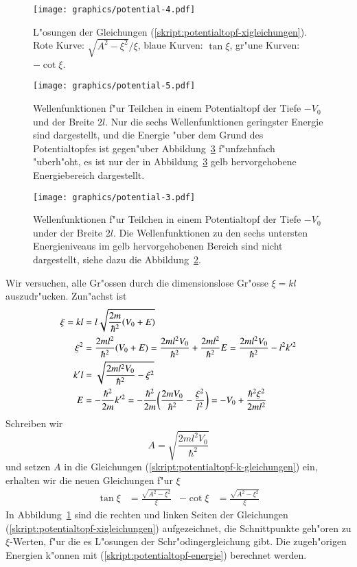\begin{figure}
\centering
\texttt{[image: graphics/potential-4.pdf]}
\caption{L"osungen der Gleichungen (\ref{skript:potentialtopf-xigleichungen}).
Rote Kurve: $\sqrt{A^2-\xi^2}/\xi$, blaue Kurven: $\tan\xi$, gr"une
Kurven: $-\cot\xi$.
\label{skript:loesungen-xigleichungen}}
\end{figure}%
\begin{figure}
\centering
\texttt{[image: graphics/potential-5.pdf]}
\caption{Wellenfunktionen f"ur Teilchen in einem Potentialtopf der
Tiefe $-V_0$ und der Breite $2l$.
Nur die sechs Wellenfunktionen geringster Energie sind dargestellt,
und die Energie "uber dem
Grund des Potentialtopfes ist gegen"uber
Abbildung~\ref{skript:potentialtopf-loesungen}
f"unfzehnfach "uberh"oht, es ist nur der in
Abbildung~\ref{skript:potentialtopf-loesungen}
gelb hervorgehobene Energiebereich dargestellt.
\label{skript:potentialtopf-loesungen-klein}}
\end{figure}
\begin{figure}
\centering
\texttt{[image: graphics/potential-3.pdf]}
\caption{Wellenfunktionen f"ur Teilchen in einem Potentialtopf der
Tiefe $-V_0$ under der Breite $2l$.
Die Wellenfunktionen zu den sechs
untersten Energieniveaus im gelb hervorgehobenen Bereich
sind nicht dargestellt, siehe dazu die
Abbildung~\ref{skript:potentialtopf-loesungen-klein}.
\label{skript:potentialtopf-loesungen}}
\end{figure}
Wir versuchen, alle Gr"ossen durch die dimensionslose Gr"osse $\xi=kl$
auszudr"ucken.
Zun"achst ist
\begin{align}
\xi=kl&=l\sqrt{\frac{2m}{\hbar^2}(V_0+E)}
\notag
\\
\xi^2
&=
\frac{2ml^2}{\hbar^2}(V_0+E)
=
\frac{2ml^2V_0}{\hbar^2} +\frac{2ml^2}{\hbar^2}E
=
\frac{2ml^2V_0}{\hbar^2}-l^2k'^2
\notag
\\
k'l
&=
\sqrt{\frac{2ml^2V_0}{\hbar^2} - \xi^2}
\notag
\\
E
&=
-\frac{\hbar^2}{2m}k'^2
=
-\frac{\hbar^2}{2m}
\biggl(
\frac{2mV_0}{\hbar^2} - \frac{\xi^2}{l^2}
\biggr)
=
-V_0+\frac{\hbar^2\xi^2}{2ml^2}
\label{skript:potentialtopf-energie}
\end{align}
Schreiben wir
\[
A=\sqrt{\frac{2ml^2V_0}{\hbar^2}}
\]
und setzen $A$ in die Gleichungen
(\ref{skript:potentialtopf-k-gleichungen}) ein,
erhalten wir die neuen Gleichungen f"ur $\xi$
\begin{align}
\tan \xi&=\frac{\sqrt{A^2-\xi^2}}{\xi}
&
-\cot \xi&=\frac{\sqrt{A^2-\xi^2}}{\xi}
\label{skript:potentialtopf-xigleichungen}
\end{align}
In Abbildung~\ref{skript:loesungen-xigleichungen} sind die rechten und linken
Seiten der Gleichungen (\ref{skript:potentialtopf-xigleichungen}) aufgezeichnet,
die Schnittpunkte geh"oren zu $\xi$-Werten, f"ur die es L"osungen
der Schr"odingergleichung gibt.
Die zugeh"origen Energien k"onnen mit (\ref{skript:potentialtopf-energie})
berechnet werden.

